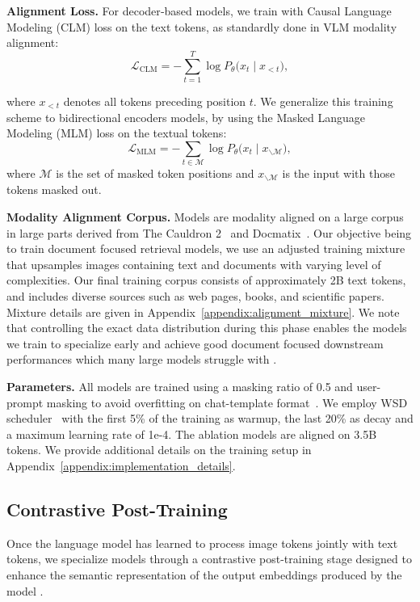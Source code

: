 \noindent\textbf{Alignment Loss.} 
For decoder‑based models, we train with Causal Language Modeling (CLM) loss on the text tokens, as standardly done in VLM modality alignment:
\begin{equation}
\mathcal{L}_{\text{CLM}}
  = -\sum_{t=1}^{T} \log P_{\theta}\!\bigl(x_t \mid x_{<t}\bigr),
\end{equation}

where $x_{<t}$ denotes all tokens preceding position $t$. We generalize this training scheme to bidirectional encoders models, by using the Masked Language Modeling (MLM) loss on the textual tokens:
\begin{equation}
\mathcal{L}_{\text{MLM}}
  = -\sum_{t \in \mathcal{M}} \log P_{\theta}\!\bigl(x_t \mid x_{\backslash\mathcal{M}}\bigr),
\end{equation}
where $\mathcal{M}$ is the set of masked token positions and
$x_{\backslash\mathcal{M}}$ is the input with those tokens masked out.


\noindent\textbf{Modality Alignment Corpus.} Models are modality aligned on a large corpus in large parts derived from The Cauldron 2~\citep{laurençon2024mattersbuildingvisionlanguagemodels} and Docmatix~\citep{laurençon2024building}. Our objective being to train document focused retrieval models, we use an adjusted training mixture that upsamples images containing text and documents with varying level of complexities. Our final training corpus consists of approximately 2B text tokens, and includes diverse sources such as web pages, books, and scientific papers. Mixture details are given in Appendix~\ref{appendix:alignment_mixture}. We note that controlling the exact data distribution during this phase enables the models we train to specialize early and achieve good document focused downstream performances which many large models struggle with \citep{liu_improved_2023}.

\noindent\textbf{Parameters.} All models are trained using a masking ratio of 0.5 and user-prompt masking to avoid overfitting on chat-template format~\citep{huertaenochian2024instructionfinetuningdoesprompt,shi2024instructiontuninglossinstructions,allal2025smollm2smolgoesbig}. We employ WSD scheduler~\citep{hu2024minicpmunveilingpotentialsmall} with the first 5\% of the training as warmup, the last 20\% as decay and a maximum learning rate of 1e-4. The ablation models are aligned on 3.5B tokens. We provide additional details on the training setup in Appendix~\ref{appendix:implementation_details}.

\subsection{Contrastive Post-Training}
\label{sec:contrastive_posttraining}
Once the language model has learned to process image tokens jointly with text tokens, we specialize models through a contrastive post-training stage designed to enhance the semantic representation of the output embeddings produced by the model \citep{reimers_sentence-bert_2019}. 

